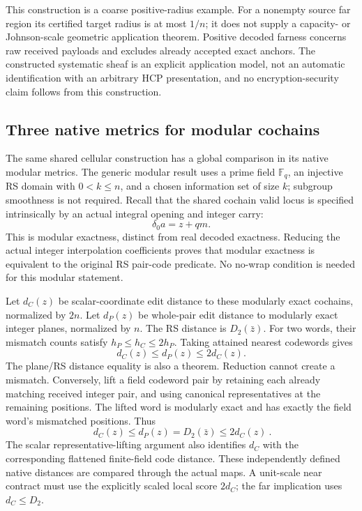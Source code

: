 This construction is a coarse positive-radius example. For a nonempty source
far region its certified target radius is at most \(1/n\); it does not supply
a capacity- or Johnson-scale geometric application theorem. Positive decoded
farness concerns raw received payloads and excludes already accepted exact
anchors. The constructed systematic sheaf is an explicit application model,
not an automatic identification with an arbitrary HCP presentation, and no
encryption-security claim follows from this construction.

\subsection{Three native metrics for modular cochains}

The same shared cellular construction has a global comparison in its native
modular metrics. The generic modular result uses a prime field \(\mathbb F_q\), an
injective RS domain with \(0<k\le n\), and a chosen information set of size
\(k\); subgroup smoothness is not required. Recall that the shared cochain
valid locus is specified intrinsically by an actual integral opening and
integer carry:
\[
 \delta_0a=z+qm.
\]
This is modular exactness, distinct from real decoded exactness. Reducing the
actual integer interpolation coefficients proves that modular exactness is
equivalent to the original RS pair-code predicate. No no-wrap condition is
needed for this modular statement.

Let \(d_C(z)\) be scalar-coordinate edit distance to these modularly exact
cochains, normalized by \(2n\). Let \(d_P(z)\) be whole-pair edit distance
to modularly exact integer planes, normalized by \(n\). The RS distance is
\(D_2(\bar z)\). For two words, their mismatch counts satisfy
\(h_P\le h_C\le2h_P\). Taking attained nearest codewords gives
\[
 d_C(z)\le d_P(z)\le2d_C(z).
\]
The plane/RS distance equality is also a theorem. Reduction cannot create a
mismatch. Conversely, lift a field codeword pair by retaining each already
matching received integer pair, and using canonical representatives at the
remaining positions. The lifted word is modularly exact and has exactly the
field word's mismatched positions. Thus
\[
 \boxed{\ d_C(z)\le d_P(z)=D_2(\bar z)\le2d_C(z)\ }.
\]
The scalar representative-lifting argument also identifies \(d_C\) with
the corresponding flattened finite-field code distance. These independently
defined native distances are compared through the actual maps. A unit-scale
near contract must use the explicitly scaled local score \(2d_C\); the
far implication uses \(d_C\le D_2\).

